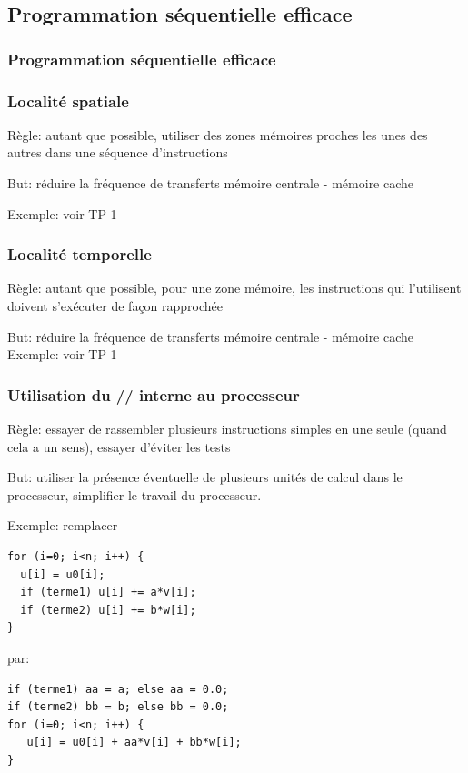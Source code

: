 \documentclass{beamer}
\begin{document}
\begin{frame}
\section{Programmation s\'equentielle efficace}
\frametitle{Programmation s\'equentielle efficace}
\end{frame}

\begin{frame}
\frametitle{Localit\'e spatiale}
Règle: autant que possible, utiliser des zones m\'emoires proches les unes des autres dans une s\'equence d'instructions

\vfill
But: r\'eduire la fr\'equence de transferts m\'emoire centrale - m\'emoire cache

\vfill
Exemple: voir TP 1
\end{frame}

\begin{frame}
\frametitle{Localit\'e temporelle}
Règle: autant que possible, pour une zone m\'emoire, les instructions qui l'utilisent doivent s'ex\'ecuter de façon rapproch\'ee

\vfill
But: r\'eduire la fr\'equence de transferts m\'emoire centrale - m\'emoire cache
\vfill
Exemple: voir TP 1
\end{frame}

\begin{frame}[fragile]
\frametitle{Utilisation du // interne au processeur}
Règle: essayer de rassembler plusieurs instructions simples en une seule (quand cela a un sens), essayer d'\'eviter les tests

\bigskip
But: utiliser la pr\'esence \'eventuelle de plusieurs unit\'es de calcul dans le processeur, simplifier le travail du processeur.

\end{frame}

\begin{frame}[fragile]
Exemple: remplacer
\begin{lstlisting}
for (i=0; i<n; i++) {
  u[i] = u0[i];
  if (terme1) u[i] += a*v[i];
  if (terme2) u[i] += b*w[i];
}
\end{lstlisting}

par:
\begin{lstlisting}
if (terme1) aa = a; else aa = 0.0;
if (terme2) bb = b; else bb = 0.0;
for (i=0; i<n; i++) {
   u[i] = u0[i] + aa*v[i] + bb*w[i];
}
\end{lstlisting}

\end{frame}
\end{document}

